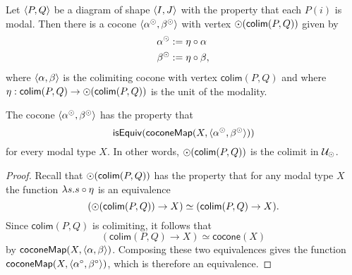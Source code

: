 \begin{defn}
Let ${\langle P,Q\rangle}$ be a diagram of shape ${\langle I,J\rangle}$ with the property that each
$P(i)$ is modal. Then there is a cocone ${\langle \alpha^{\odot},\beta^{\odot}\rangle}$
 with vertex $\odot(\mathsf{colim}(P,Q))$ given by
\begin{align*}
\alpha^{\odot} & := \eta\circ\alpha\\
\beta^{\odot} & := \eta\circ\beta,
\end{align*}
where ${\langle \alpha,\beta\rangle}$ is the colimiting cocone with vertex
$\mathsf{colim}(P,Q)$ and where $\eta:\mathsf{colim}(P,Q)\to\odot(\mathsf{colim}(P,Q))$
is the unit of the modality.
\end{defn}

\begin{lem}
The cocone ${\langle \alpha^{\odot},\beta^{\odot}\rangle}$ has the property that
\begin{equation*}
\mathsf{isEquiv}(\mathsf{coconeMap}(X,{\langle \alpha^{\odot},\beta^{\odot}\rangle}))
\end{equation*}
for every modal type $X$. In other words, $\odot(\mathsf{colim}(P,Q))$ is the
colimit in $\mathcal{U}_{\odot}$. 
\end{lem}

\begin{proof}
Recall that $\odot(\mathsf{colim}(P,Q))$ has the property that for any modal
type $X$ the function $\lambda s.s\circ \eta$ is an equivalence
\begin{equation*}
(\odot(\mathsf{colim}(P,Q))\to X)\simeq (\mathsf{colim}(P,Q)\to X).
\end{equation*}
Since $\mathsf{colim}(P,Q)$ is colimiting, it follows that
\begin{equation*}
(\mathsf{colim}(P,Q)\to X)\simeq\mathsf{cocone}(X)
\end{equation*}
by $\mathsf{coconeMap}(X,{\langle \alpha,\beta\rangle})$. Composing these two equivalences
gives the function $\mathsf{coconeMap}(X,{\langle \alpha^\circ,\beta^\circ\rangle})$,
which is therefore an equivalence.
\end{proof}

